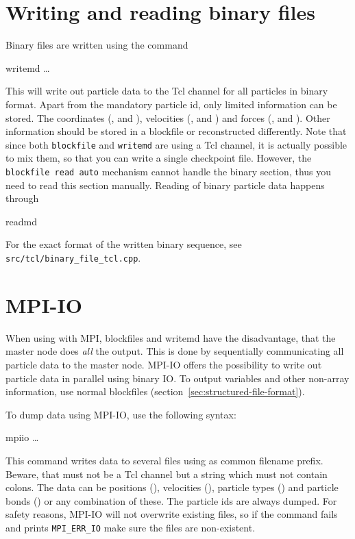 \section{Writing and reading binary files}

Binary files are written using the command
\begin{essyntax}
  writemd  \dots
\end{essyntax}
This will write out particle data to the Tcl channel  for
all particles in binary format. Apart from the mandatory particle id,
only limited information can be stored. The coordinates (,
 and ), velocities (,  and
) and forces (,  and ). Other
information should be stored in a blockfile or reconstructed
differently. Note that since both \texttt{blockfile} and
\texttt{writemd} are using a Tcl channel, it is actually possible to
mix them, so that you can write a single checkpoint file. However, the
\texttt{blockfile read auto} mechanism cannot handle the binary
section, thus you need to read this section manually. Reading of
binary particle data happens through
\begin{essyntax}
  readmd 
\end{essyntax}
For the exact format of the written binary sequence, see
\texttt{src/tcl/binary_file_tcl.cpp}.


\section{MPI-IO}

When using \es with MPI, blockfiles and writemd have the disadvantage,
that the master node does \textit{all} the output. This is done by
sequentially communicating all particle data to the master node. MPI-IO
offers the possibility to write out particle data in parallel using
binary IO. To output variables and other non-array information, use
normal blockfiles (section~\ref{sec:structured-file-format}).

To dump data using MPI-IO, use the following syntax:
\begin{essyntax}
  mpiio   \dots
\end{essyntax}
This command writes data to several files using  as
common filename prefix. Beware, that  must not be a Tcl channel
but a string which must not contain colons. The data can be positions
(), velocities (), particle types () and
particle bonds () or any combination of these. The particle ids
are always dumped. For safety reasons, MPI-IO will not overwrite existing
files, so if the command fails and prints \texttt{MPI_ERR_IO} make sure the
files are non-existent.

